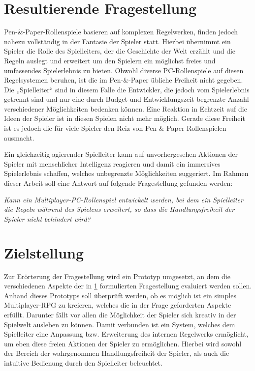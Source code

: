 \section{Resultierende Fragestellung}
\label{sec:WissenschaftlicheFrage}

Pen-\&-Paper-Rollenspiele basieren auf komplexen Regelwerken, finden jedoch nahezu vollständig in der Fantasie der Spieler statt. Hierbei übernimmt ein Spieler die Rolle des Spielleiters, der die Geschichte der Welt erzählt und die Regeln auslegt und erweitert um den Spielern ein möglichst freies und umfassendes Spielerlebnis zu bieten. Obwohl diverse PC-Rollenspiele auf diesen Regelsystemen beruhen, ist die im Pen-\&-Paper übliche Freiheit nicht gegeben. Die „Spielleiter“ sind in diesem Falle die Entwickler, die jedoch vom Spielerlebnis getrennt sind und nur eine durch Budget und Entwicklungszeit begrenzte Anzahl verschiedener Möglichkeiten bedenken können. Eine Reaktion in Echtzeit auf die Ideen der Spieler ist in diesen Spielen nicht mehr möglich. Gerade diese Freiheit ist es jedoch die für viele Spieler den Reiz von Pen-\&-Paper-Rollenspielen ausmacht.

Ein gleichzeitig agierender Spielleiter kann auf unvorhergesehen Aktionen der Spieler mit menschlicher Intelligenz reagieren und damit ein immersives Spielerlebnis schaffen, welches unbegrenzte Möglichkeiten suggeriert.
Im Rahmen dieser Arbeit soll eine Antwort auf folgende
Fragestellung gefunden werden:
\vspace*{0.5em}\begin{center}\parbox{0.9\linewidth}{
  \emph{Kann ein Multiplayer-PC-Rollenspiel entwickelt werden, bei dem ein Spielleiter die Regeln während des Spielens erweitert, so dass die Handlungsfreiheit der Spieler nicht behindert wird?}
} \end{center}\vspace*{0.5em}

\section{Zielstellung}
\label{sec:Zielstellung}

Zur Erörterung der Fragestellung wird ein Prototyp umgesetzt, an dem die verschiedenen Aspekte der in \ref{sec:WissenschaftlicheFrage} formulierten Fragestellung evaluiert werden sollen. Anhand dieses Prototyps soll überprüft werden, ob es möglich ist ein simples Multiplayer-RPG zu kreieren, welches die in der Frage geforderten Aspekte erfüllt. Darunter fällt vor allen die Möglichkeit der Spieler sich kreativ in der Spielwelt ausleben zu können. Damit verbunden ist ein System, welches dem Spielleiter eine Anpassung bzw. Erweiterung des internen Regelwerks ermöglicht, um eben diese freien Aktionen der Spieler zu ermöglichen. Hierbei wird sowohl der Bereich der wahrgenommen Handlungsfreiheit der Spieler, als auch die intuitive Bedienung durch den Spielleiter beleuchtet.

